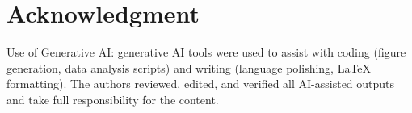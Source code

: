 \documentclass[10pt, conference, letterpaper]{IEEEtran}
\begin{document}
\section*{Acknowledgment}

Use of Generative AI: generative AI tools were used to assist with coding (figure generation, data analysis scripts) and writing (language polishing, LaTeX formatting). The authors reviewed, edited, and verified all AI-assisted outputs and take full responsibility for the content.



\end{document}
